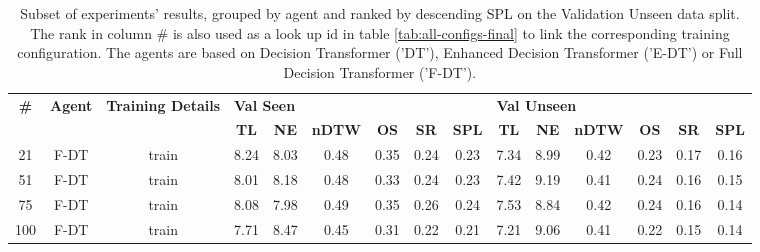 \begin{table}
\centering
\caption{\label{tab:instruction_encoding_full}Subset of experiments' results, grouped by agent and ranked by descending SPL on the Validation Unseen data split. The rank in column \# is also used as a look up id in table \ref{tab:all-configs-final} to link the corresponding training configuration.     \newline The agents are based on Decision Transformer ('DT'), Enhanced Decision Transformer ('E-DT') or Full Decision Transformer ('F-DT').}
\begin{tabular}{@{\hskip3pt}c@{\hskip3pt}c@{\hskip3pt}c@{\hskip3pt}c@{\hskip3pt}c@{\hskip3pt}c@{\hskip3pt}c@{\hskip3pt}c@{\hskip3pt}c@{\hskip3pt}c@{\hskip3pt}c@{\hskip3pt}c@{\hskip3pt}c@{\hskip3pt}c@{\hskip3pt}c}
\toprule
\textbf{\#} & \textbf{Agent} & \textbf{Training Details} & \multicolumn{6}{l}{\textbf{Val Seen}} & \multicolumn{6}{l}{\textbf{Val Unseen}} \\
 \textbf{~} &     \textbf{~} &                \textbf{~} &       \textbf{TL} & \textbf{NE} & \textbf{nDTW} & \textbf{OS} & \textbf{SR} & \textbf{SPL} &         \textbf{TL} & \textbf{NE} & \textbf{nDTW} & \textbf{OS} & \textbf{SR} & \textbf{SPL} \\
\midrule
         21 &           F-DT &                     train &              8.24 &        8.03 &          0.48 &        0.35 &        0.24 &         0.23 &                7.34 &        8.99 &          0.42 &        0.23 &        0.17 &         0.16 \\
         51 &           F-DT &                     train &              8.01 &        8.18 &          0.48 &        0.33 &        0.24 &         0.23 &                7.42 &        9.19 &          0.41 &        0.24 &        0.16 &         0.15 \\
         75 &           F-DT &                     train &              8.08 &        7.98 &          0.49 &        0.35 &        0.26 &         0.24 &                7.53 &        8.84 &          0.42 &        0.24 &        0.16 &         0.14 \\
        100 &           F-DT &                     train &              7.71 &        8.47 &          0.45 &        0.31 &        0.22 &         0.21 &                7.21 &        9.06 &          0.41 &        0.22 &        0.15 &         0.14 \\
\bottomrule
\end{tabular}
\end{table}
